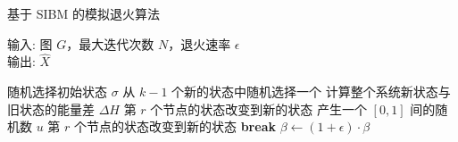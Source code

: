 \documentclass{article}
\begin{document}
	\begin{algorithm}[H]
		\caption{基于 SIBM 的模拟退火算法} \label{alg:m}
		输入: 图 $G$，最大迭代次数 $N$，退火速率 $\epsilon$ \\
		输出: $\hat{X}$
		\begin{algorithmic}[1]
			\STATE 随机选择初始状态 $\sigma$
			\STATE 从 $k-1$ 个新的状态中随机选择一个
			\STATE 计算整个系统新状态与旧状态的能量差 $\Delta H$
			\STATE 第 $r$ 个节点的状态改变到新的状态
			\ELSE
			\STATE 产生一个 $[0,1]$ 间的随机数  $u$ 
			\STATE 第 $r$ 个节点的状态改变到新的状态
			\ENDIF
			\ENDIF
			\ENDFOR
			\STATE \textbf{break}
			\ENDIF
			\STATE $\beta \leftarrow (1 + \epsilon)\cdot\beta$
			\ENDWHILE
		\end{algorithmic}
	\end{algorithm}
\end{document}
